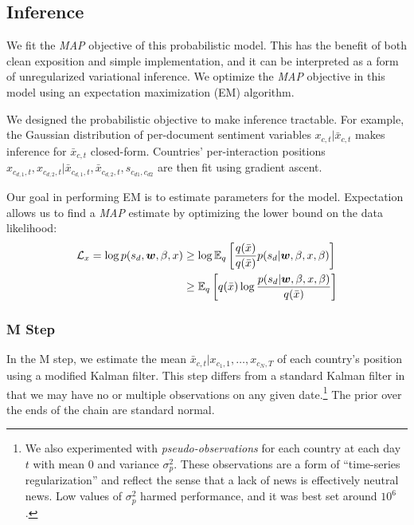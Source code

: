 
\subsection{Inference}
We fit the \emph{MAP} objective of this probabilistic model.  This has
the benefit of both clean exposition and simple implementation, and it
can be interpreted as a form of unregularized variational inference.
We optimize the \emph{MAP} objective in this model using an
expectation maximization (EM) algorithm.

We designed the probabilistic objective to make inference tractable.
For example, the Gaussian distribution of per-document sentiment
variables $x_{c, t} | \bar x_{c,t}$ makes inference for $\bar x_{c,t}$
closed-form.  Countries' per-interaction positions $x_{c_{d,1}, t},
x_{c_{d,2},t} | \bar x_{c_{d,1},t}, \bar x_{c_{d,2}, t}, s_{c_{d1},
  c_{d2}}$ are then fit using gradient ascent.

Our goal in performing EM is to estimate parameters for the model.  Expectation allows us to find a \emph{MAP} estimate by optimizing the lower bound on the data likelihood:
\begin{align}
  \mathcal{L}_x = \log p(s_d, \bm w, \beta, x)
  & \ge \log \mathbb{E}_q\left[ \frac{q(\bar x)}{q(\bar x)}
    p(s_d | \bm w, \beta, x, \beta) \right] \nonumber \\
  & \ge \mathbb{E}_q\left[ q(\bar x)
    \log \frac{ p(s_d | \bm w, \beta, x, \beta) }{
      q(\bar x)} \right]
\end{align}

\subsubsection{M Step} In the M step, we estimate the mean $\bar
x_{c,t} | x_{c_1,1}, \ldots, x_{c_N,T}$ of each country's position
using a modified Kalman filter.  This step differs from a
standard Kalman filter in that we may have no or multiple observations
on any given date.\footnote{We also experimented with
  \emph{pseudo-observations} for each country at each day $t$ with
  mean 0 and variance $\sigma_p^2$.  These observations are a form of
  ``time-series regularization'' and reflect the sense that a lack of
  news is effectively neutral news.  Low values of $\sigma_p^2$ harmed
  performance, and it was best set around $10^6$.}  The prior over the
ends of the chain are standard normal.

